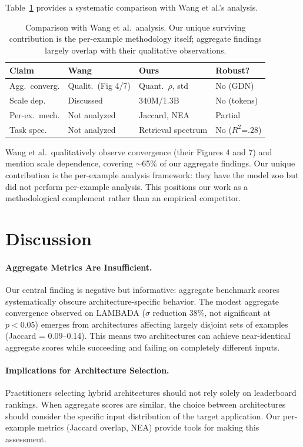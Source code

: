 \documentclass[11pt,a4paper]{article}
\begin{document}
Table~\ref{tab:wang} provides a systematic comparison with Wang et al.'s analysis.

\begin{table}[t]
\centering
\small
\begin{tabular}{p{1.6cm}p{1.3cm}p{1.8cm}p{1.4cm}}
\toprule
\textbf{Claim} & \textbf{Wang} & \textbf{Ours} & \textbf{Robust?} \\
\midrule
Agg.\ converg. & Qualit.\ (Fig 4/7) & Quant.\ $\rho$, std & No (GDN) \\
Scale dep. & Discussed & 340M/1.3B & No (tokens) \\
Per-ex.\ mech. & Not analyzed & Jaccard, NEA & Partial \\
Task spec. & Not analyzed & Retrieval spectrum & No ($R^2$=.28) \\
\bottomrule
\end{tabular}
\caption{Comparison with Wang et al.\ analysis. Our unique surviving contribution is the per-example methodology itself; aggregate findings largely overlap with their qualitative observations.}
\label{tab:wang}
\end{table}

Wang et al.\ qualitatively observe convergence (their Figures 4 and 7) and mention scale dependence, covering $\sim$65\% of our aggregate findings.
Our unique contribution is the per-example analysis framework: they have the model zoo but did not perform per-example analysis.
This positions our work as a methodological complement rather than an empirical competitor.

\section{Discussion}
\label{sec:discussion}

\paragraph{Aggregate Metrics Are Insufficient.}
Our central finding is negative but informative: aggregate benchmark scores systematically obscure architecture-specific behavior.
The modest aggregate convergence observed on LAMBADA ($\sigma$ reduction 38\%, not significant at $p < 0.05$) emerges from architectures affecting largely disjoint sets of examples (Jaccard = 0.09--0.14).
This means two architectures can achieve near-identical aggregate scores while succeeding and failing on completely different inputs.

\paragraph{Implications for Architecture Selection.}
Practitioners selecting hybrid architectures should not rely solely on leaderboard rankings.
When aggregate scores are similar, the choice between architectures should consider the specific input distribution of the target application.
Our per-example metrics (Jaccard overlap, NEA) provide tools for making this assessment.
\end{document}
